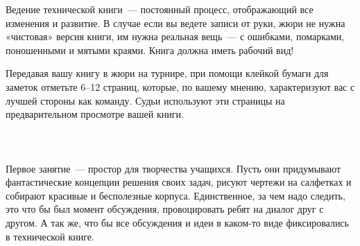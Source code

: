 Ведение технической книги~--- постоянный процесс,  отображающий все изменения и развитие. В случае если вы ведете записи от руки, жюри не нужна «чистовая» версия книги, им нужна реальная вещь~--- с ошибками, помарками, поношенными и мятыми краями. Книга должна иметь рабочий вид! 

Передавая вашу книгу в жюри на турнире, при помощи клейкой бумаги для заметок отметьте 6--12 страниц, которые, по вашему мнению, характеризуют вас с лучшей стороны как команду. Судьи используют эти страницы на предварительном просмотре вашей книги.\\\\
\clearpage
{\hypertarget{lesson23x4}{}}\\\\

Первое занятие~--- простор для творчества учащихся. Пусть они придумывают фантастические концепции решения своих задач, рисуют чертежи на салфетках и собирают красивые и бесполезные корпуса. Единственное, за чем надо следить, это что бы  был момент обсуждения, провоцировать ребят на диалог друг с другом. А так же, что бы все обсуждения и идеи в каком-то виде фиксировались в технической книге.
